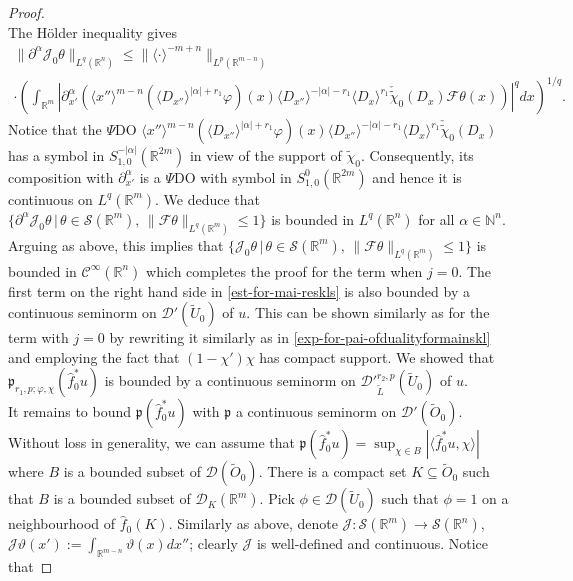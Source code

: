 \documentclass[12pt,reqno]{amsart}
\newcommand{\NN}{\mathbb N}
\newcommand{\RR}{\mathbb R}
\newcommand{\DD}{\mathcal D}
\newcommand{\SSS}{\mathcal S}
\theoremstyle{plain}
\theoremstyle{remark}
\theoremstyle{definition}
\numberwithin{equation}{section}
\begin{document}
\begin{proof}
\begin{equation*}
\end{equation*}
The H\"older inequality gives
\begin{multline*}
\|\partial^{\alpha}\mathcal{J}_0\theta\|_{L^q(\RR^n)}\leq \|\langle\cdot\rangle^{-m+n}\|_{L^p(\RR^{m-n})}\\
\cdot\left(\int_{\RR^m}\left|\partial^{\alpha}_{x'}\left(\langle x''\rangle^{m-n}\left(\langle D_{x''}\rangle^{|\alpha|+r_1}\varphi\right)(x) \langle D_{x''}\rangle^{-|\alpha|-r_1} \langle D_x\rangle^{r_1}\check{\widetilde{\chi}}_0(D_x) \mathcal{F}\theta(x)\right)\right|^qdx\right)^{1/q}.
\end{multline*}
Notice that the $\Psi$DO $\langle x''\rangle^{m-n}\left(\langle D_{x''}\rangle^{|\alpha|+r_1}\varphi\right)(x)\langle D_{x''}\rangle^{-|\alpha|-r_1} \langle D_x\rangle^{r_1}\check{\widetilde{\chi}}_0(D_x)$ has a symbol in $S^{-|\alpha|}_{1,0}(\RR^{2m})$ in view of the support of $\widetilde{\chi}_0$. Consequently, its composition with $\partial^{\alpha}_{x'}$ is a $\Psi$DO with symbol in $S^0_{1,0}(\RR^{2m})$ and hence it is continuous on $L^q(\RR^m)$. We deduce that $\{\partial^{\alpha}\mathcal{J}_0\theta\,|\, \theta\in\SSS(\RR^m),\, \|\mathcal{F}\theta\|_{L^q(\RR^m)}\leq 1\}$ is bounded in $L^q(\RR^n)$ for all $\alpha\in\NN^n$. Arguing as above, this implies that $\{\mathcal{J}_0\theta\,|\, \theta\in\SSS(\RR^m),\, \|\mathcal{F}\theta\|_{L^q(\RR^m)}\leq 1\}$ is bounded in $\mathcal{C}^{\infty}(\RR^n)$ which completes the proof for the term when $j=0$. The first term on the right hand side in \eqref{est-for-mai-reskls} is also bounded by a continuous seminorm on $\DD'(\widetilde{U}_0)$ of $u$. This can be shown similarly as for the term with $j=0$ by rewriting it similarly as in \eqref{exp-for-pai-ofdualityformainskl} and employing the fact that $(1-\chi')\chi$ has compact support. We showed that $\mathfrak{p}_{r_1,p;\varphi,\chi}(\hat{f}^*_0u)$ is bounded by a continuous seminorm on $\DD'^{r_2,p}_{\widetilde{L}}(\widetilde{U}_0)$ of $u$.\\
\indent It remains to bound $\mathfrak{p}(\hat{f}^*_0u)$ with $\mathfrak{p}$ a continuous seminorm on $\DD'(\widetilde{O}_0)$. Without loss in generality, we can assume that $\mathfrak{p}(\hat{f}^*_0u)=\sup_{\chi\in B}|\langle \hat{f}^*_0u,\chi\rangle|$ where $B$ is a bounded subset of $\DD(\widetilde{O}_0)$. There is a compact set $K\subseteq\widetilde{O}_0$ such that $B$ is a bounded subset of $\DD_K(\RR^m)$. Pick $\phi\in\DD(\widetilde{U}_0)$ such that $\phi=1$ on a neighbourhood of $\hat{f}_0(K)$. Similarly as above, denote $\mathcal{J}:\SSS(\RR^m)\rightarrow\SSS(\RR^n)$, $\mathcal{J}\vartheta(x'):=\int_{\RR^{m-n}}\vartheta(x)dx''$; clearly $\mathcal{J}$ is well-defined and continuous. Notice that

\end{proof}
\end{document}
